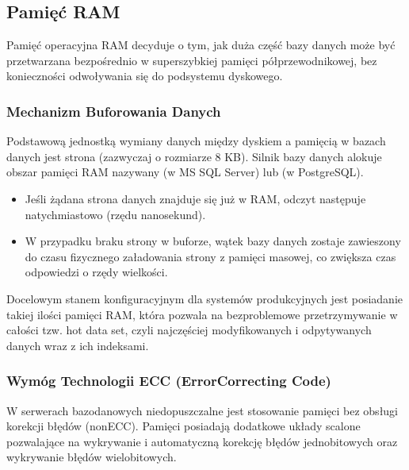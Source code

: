 \documentclass[a4paper,11pt,english,openany,oneside]{sphinxmanual}
\begin{document}
\subsection{Pamięć RAM}
\label{\detokenize{rozdzial_2/rozdzial_21/index:pamiec-ram}}
\sphinxAtStartPar
Pamięć operacyjna RAM decyduje o tym, jak duża część bazy danych może być przetwarzana bezpośrednio w super\sphinxhyphen{}szybkiej pamięci półprzewodnikowej, bez konieczności odwoływania się do podsystemu dyskowego.


\subsubsection{Mechanizm Buforowania Danych}
\label{\detokenize{rozdzial_2/rozdzial_21/index:mechanizm-buforowania-danych}}
\sphinxAtStartPar
Podstawową jednostką wymiany danych między dyskiem a pamięcią w bazach danych jest strona (zazwyczaj o rozmiarze 8 KB). Silnik bazy danych alokuje obszar pamięci RAM nazywany  (w MS SQL Server) lub  (w PostgreSQL).
\begin{itemize}
\item {} 
\sphinxAtStartPar
{} Jeśli żądana strona danych znajduje się już w RAM, odczyt następuje natychmiastowo (rzędu nanosekund).

\item {} 
\sphinxAtStartPar
{} W przypadku braku strony w buforze, wątek bazy danych zostaje zawieszony do czasu fizycznego załadowania strony z pamięci masowej, co zwiększa czas odpowiedzi o rzędy wielkości.

\end{itemize}

\sphinxAtStartPar
Docelowym stanem konfiguracyjnym dla systemów produkcyjnych jest posiadanie takiej ilości pamięci RAM, która pozwala na bezproblemowe przetrzymywanie w całości tzw. hot data set, czyli najczęściej modyfikowanych i odpytywanych danych wraz z ich indeksami.


\subsubsection{Wymóg Technologii ECC (Error\sphinxhyphen{}Correcting Code)}
\label{\detokenize{rozdzial_2/rozdzial_21/index:wymog-technologii-ecc-error-correcting-code}}
\sphinxAtStartPar
W serwerach bazodanowych niedopuszczalne jest stosowanie pamięci bez obsługi korekcji błędów (non\sphinxhyphen{}ECC). Pamięci  posiadają dodatkowe układy scalone pozwalające na wykrywanie i automatyczną korekcję błędów jednobitowych oraz wykrywanie błędów wielobitowych.
\end{document}
